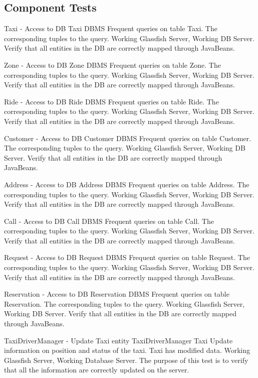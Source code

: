 \subsection{Component Tests} %
\label{sub:component_tests}

\testx
{Taxi - Access to DB}
{Taxi}
{DBMS}
{Frequent queries on table Taxi.}
{The corresponding tuples to the query.}
{Working Glassfish Server, Working DB Server.}
{Verify that all entities in the DB are correctly mapped through JavaBeans.}

\testx
{Zone - Access to DB}
{Zone}
{DBMS}
{Frequent queries on table Zone.}
{The corresponding tuples to the query.}
{Working Glassfish Server, Working DB Server.}
{Verify that all entities in the DB are correctly mapped through JavaBeans.}

\testx
{Ride - Access to DB}
{Ride}
{DBMS}
{Frequent queries on table Ride.}
{The corresponding tuples to the query.}
{Working Glassfish Server, Working DB Server.}
{Verify that all entities in the DB are correctly mapped through JavaBeans.}

\testx
{Customer - Access to DB}
{Customer}
{DBMS}
{Frequent queries on table Customer.}
{The corresponding tuples to the query.}
{Working Glassfish Server, Working DB Server.}
{Verify that all entities in the DB are correctly mapped through JavaBeans.}

\testx
{Address - Access to DB}
{Address}
{DBMS}
{Frequent queries on table Address.}
{The corresponding tuples to the query.}
{Working Glassfish Server, Working DB Server.}
{Verify that all entities in the DB are correctly mapped through JavaBeans.}

\testx
{Call - Access to DB}
{Call}
{DBMS}
{Frequent queries on table Call.}
{The corresponding tuples to the query.}
{Working Glassfish Server, Working DB Server.}
{Verify that all entities in the DB are correctly mapped through JavaBeans.}

\testx
{Request - Access to DB}
{Request}
{DBMS}
{Frequent queries on table Request.}
{The corresponding tuples to the query.}
{Working Glassfish Server, Working DB Server.}
{Verify that all entities in the DB are correctly mapped through JavaBeans.}

\testx
{Reservation - Access to DB}
{Reservation}
{DBMS}
{Frequent queries on table Reservation.}
{The corresponding tuples to the query.}
{Working Glassfish Server, Working DB Server.}
{Verify that all entities in the DB are correctly mapped through JavaBeans.}

\testx
{TaxiDriverManager - Update Taxi entity}
{TaxiDriverManager}
{Taxi}
{Update information on position and status of the taxi.}
{Taxi has modified data.}
{Working Glassfish Server, Working Database Server.}
{The purpose of this test is to verify that all the information are correctly
updated on the server.}


